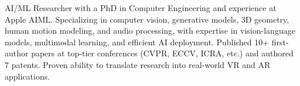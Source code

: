


\begin{cventries}

\cvtext
{ %
\begin{cvitems}
    AI/ML Researcher with a PhD in Computer Engineering and experience at Apple AIML. Specializing
    in computer vision, generative models, 3D geometry, human motion modeling, and audio processing, with
    expertise in vision-language models, multimodal learning, and efficient AI deployment.
    Published 10+ first-author papers at top-tier conferences (CVPR, ECCV, ICRA, etc.) and authored
    7 patents. Proven ability to translate research into real-world VR and AR applications.
\end{cvitems}
}


\end{cventries}
